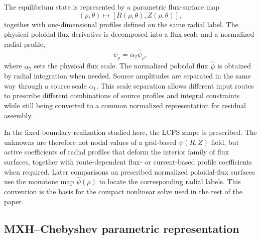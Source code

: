 \documentclass[final, 3p, times]{elsarticle}
\begin{document}
The equilibrium state is represented by a parametric flux-surface map
\begin{equation}
    (\rho,\theta) \mapsto \left[R(\rho,\theta), Z(\rho,\theta)\right],
\end{equation}
together with one-dimensional profiles defined on the same radial label. The physical poloidal-flux derivative is decomposed into a flux scale and a normalized radial profile,
\begin{equation}
    \psi_\rho = \alpha_2 \hat{\psi}_\rho,
\end{equation}
where $\alpha_2$ sets the physical flux scale. The normalized poloidal flux $\hat{\psi}$ is obtained by radial integration when needed. Source amplitudes are separated in the same way through a source scale $\alpha_1$. This scale separation allows different input routes to prescribe different combinations of source profiles and integral constraints while still being converted to a common normalized representation for residual assembly.

In the fixed-boundary realization studied here, the LCFS shape is prescribed. The unknowns are therefore not nodal values of a grid-based $\psi(R,Z)$ field, but active coefficients of radial profiles that deform the interior family of flux surfaces, together with route-dependent flux- or current-based profile coefficients when required. Later comparisons on prescribed normalized poloidal-flux surfaces use the monotone map $\hat{\psi}(\rho)$ to locate the corresponding radial labels. This convention is the basis for the compact nonlinear solve used in the rest of the paper.

\subsection{MXH--Chebyshev parametric representation}
\end{document}
